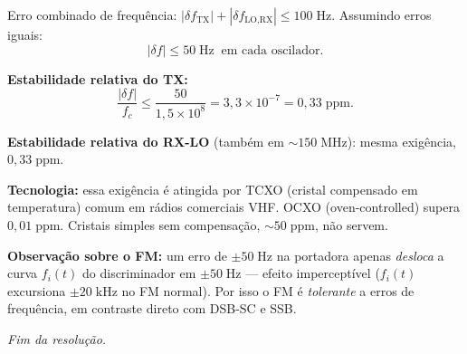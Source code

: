 \documentclass[11pt,a4paper]{article}
\begin{document}
\begin{resolucao}

Erro combinado de frequência: $|\delta f_{\text{TX}}| + |\delta f_{\text{LO,RX}}| \le 100\;\text{Hz}$. Assumindo erros iguais:
\[
  |\delta f| \le 50\;\text{Hz} \;\;\text{em cada oscilador.}
\]

\textbf{Estabilidade relativa do TX:}
\[
  \frac{|\delta f|}{f_c} \le \frac{50}{1{,}5\times 10^{8}} = 3{,}3\times 10^{-7} = 0{,}33\;\text{ppm}.
\]

\textbf{Estabilidade relativa do RX-LO} (também em $\sim 150\;\text{MHz}$): mesma exigência, $0{,}33\;\text{ppm}$.

\textbf{Tecnologia:} essa exigência é atingida por TCXO (cristal compensado em temperatura) comum em rádios comerciais VHF. OCXO (oven-controlled) supera $0{,}01\;\text{ppm}$. Cristais simples sem compensação, $\sim 50\;\text{ppm}$, não servem.

\textbf{Observação sobre o FM:} um erro de $\pm 50\;\text{Hz}$ na portadora apenas \emph{desloca} a curva $f_i(t)$ do discriminador em $\pm 50\;\text{Hz}$ — efeito imperceptível ($f_i(t)$ excursiona $\pm 20\;\text{kHz}$ no FM normal). Por isso o FM é \emph{tolerante} a erros de frequência, em contraste direto com DSB-SC e SSB.
\end{resolucao}

\vfill
\begin{center}
  \small\textit{Fim da resolução.}
\end{center}
\end{document}
